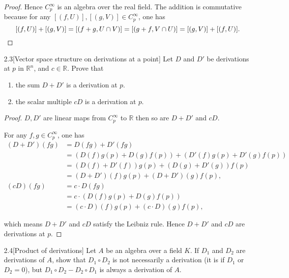 \begin{proof}
	Hence \( C^{\infty}_{p} \) is an algebra over the real field. The addition is commutative because for any \( [(f, U)], [(g, V)] \in C^{\infty}_{p} \), one has
	\[
		[(f, U)] + [(g, V)] = [(f + g, U\cap V)] = [(g + f, V\cap U)] = [(g, V)] + [(f, U)].\qedhere
	\]
\end{proof}

\begin{problem}{2.3}[Vector space structure on derivations at a point]
Let \( D \) and \( D' \) be derivations at \( p \) in \( \mathbb{R}^{n} \), and \( c\in \mathbb{R} \). Prove that
\begin{enumerate}[label={(\alph*)},leftmargin=*,itemsep=0pt]
	\item the sum \( D + D' \) is a derivation at \( p \).
	\item the scalar multiple \( cD \) is a derivation at \( p \).
\end{enumerate}
\end{problem}

\begin{proof}
	\( D, D' \) are linear maps from \( C^{\infty}_{p} \) to \( \mathbb{R} \) then so are \( D + D' \) and \( cD \).

	For any \( f, g \in C^{\infty}_{p} \), one has
	\begingroup
	\allowdisplaybreaks%
	\begin{align*}
		(D + D')(fg) & = D(fg) + D'(fg)                                  \\
		             & = (D(f)g(p) + D(g)f(p)) + (D'(f)g(p) + D'(g)f(p)) \\
		             & = (D(f) + D'(f))g(p) + (D(g) + D'(g))f(p)         \\
		             & = (D + D')(f)g(p) + (D + D')(g)f(p),              \\
		(cD)(fg)     & = c\cdot D(fg)                                    \\
		             & = c\cdot (D(f)g(p) + D(g)f(p))                    \\
		             & = (c\cdot D)(f)g(p) + (c\cdot D)(g)f(p),
	\end{align*}
	\endgroup

	which means \( D + D' \) and \( cD \) satisfy the Leibniz rule. Hence \( D + D' \) and \( cD \) are derivations at \( p \).
\end{proof}

\begin{problem}{2.4}[Product of derivations]
Let \( A \) be an algebra over a field \( K \). If \( D_{1} \) and \( D_{2} \) are derivations of \( A \), show that \( D_{1} \circ D_{2} \) is not necessarily a derivation (it is if \( D_{1} \) or \( D_{2} = 0 \)), but \( D_{1} \circ D_{2} - D_{2} \circ D_{1} \) is always a derivation of \( A \).
\end{problem}

